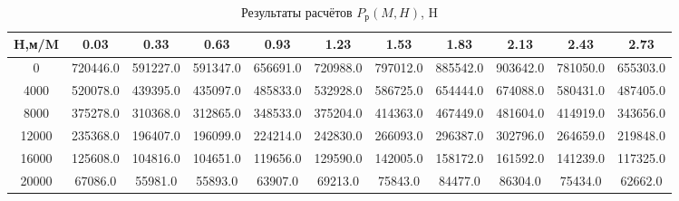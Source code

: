 \begin{table}[H]
\centering
\caption{Результаты расчётов $P_\text{р}(M,H)$, H}
\label{Pr}
\begin{tabular}{|c|c|c|c|c|c|c|c|c|c|c|}
\toprule
H,м/M &      0.03 &      0.33 &      0.63 &      0.93 &      1.23 &      1.53 &      1.83 &      2.13 &      2.43 &      2.73 \\
\midrule
0     &  720446.0 &  591227.0 &  591347.0 &  656691.0 &  720988.0 &  797012.0 &  885542.0 &  903642.0 &  781050.0 &  655303.0 \\
4000  &  520078.0 &  439395.0 &  435097.0 &  485833.0 &  532928.0 &  586725.0 &  654444.0 &  674088.0 &  580431.0 &  487405.0 \\
8000  &  375278.0 &  310368.0 &  312865.0 &  348533.0 &  375204.0 &  414363.0 &  467449.0 &  481604.0 &  414919.0 &  343656.0 \\
12000 &  235368.0 &  196407.0 &  196099.0 &  224214.0 &  242830.0 &  266093.0 &  296387.0 &  302796.0 &  264659.0 &  219848.0 \\
16000 &  125608.0 &  104816.0 &  104651.0 &  119656.0 &  129590.0 &  142005.0 &  158172.0 &  161592.0 &  141239.0 &  117325.0 \\
20000 &   67086.0 &   55981.0 &   55893.0 &   63907.0 &   69213.0 &   75843.0 &   84477.0 &   86304.0 &   75434.0 &   62662.0 \\
\bottomrule
\end{tabular}
\end{table}
